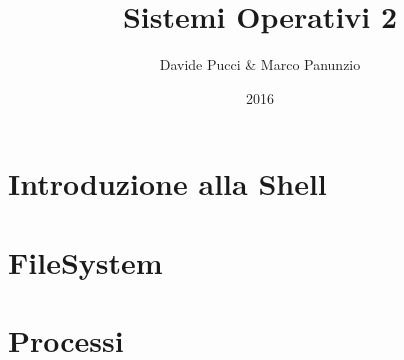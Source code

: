 

\title{Sistemi Operativi 2}
\author{Davide Pucci \& Marco Panunzio}
\date{2016}

\maketitle
\tableofcontents

\chapter{Introduzione alla Shell}


\chapter{FileSystem}


\chapter{Processi}


